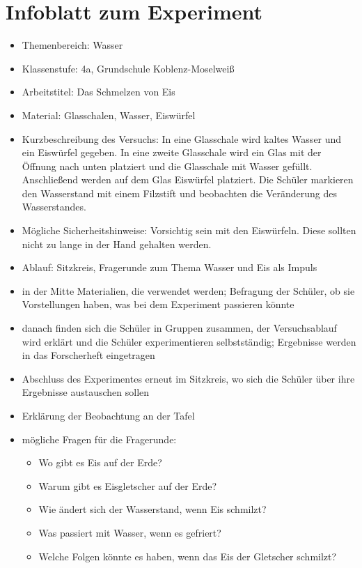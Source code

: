 \section{Infoblatt zum Experiment}

\begin{itemize}
	\item{Themenbereich: Wasser}
	\item{Klassenstufe: 4a, Grundschule Koblenz-Moselweiß}
	\item{Arbeitstitel: \glqq Das Schmelzen von Eis \grqq{}}
	\item{Material: Glasschalen, Wasser, Eiswürfel}
	\item{Kurzbeschreibung des Versuchs: In eine Glasschale wird kaltes Wasser und ein Eiswürfel gegeben. In eine zweite Glasschale wird ein Glas mit der Öffnung nach unten platziert und die Glasschale mit Wasser gefüllt. Anschließend werden auf dem Glas Eiswürfel platziert. Die Schüler markieren den Wasserstand mit einem Filzstift und beobachten die Veränderung des Wasserstandes.}
	\item{Mögliche Sicherheitshinweise: Vorsichtig sein mit den Eiswürfeln. Diese sollten nicht zu lange in der Hand gehalten werden.}
	\item{Ablauf: Sitzkreis, Fragerunde zum Thema Wasser und Eis als Impuls}
	\item{in der Mitte Materialien, die verwendet werden; Befragung der Schüler, ob sie Vorstellungen haben, was bei dem Experiment passieren könnte}
	\item{danach finden sich die Schüler in Gruppen zusammen, der Versuchsablauf wird erklärt und die Schüler experimentieren selbstständig; Ergebnisse werden in das Forscherheft eingetragen}
	\item{Abschluss des Experimentes erneut im Sitzkreis, wo sich die Schüler über ihre Ergebnisse austauschen sollen}
	\item{Erklärung der Beobachtung an der Tafel}
	\item{mögliche Fragen für die Fragerunde:
		\begin{itemize}
		\item{Wo gibt es Eis auf der Erde?}
		\item{Warum gibt es Eisgletscher auf der Erde?}
		\item{Wie ändert sich der Wasserstand, wenn Eis schmilzt?}
		\item{Was passiert mit Wasser, wenn es gefriert?}
		\item{Welche Folgen könnte es haben, wenn das Eis der Gletscher schmilzt?}
		
		\end{itemize}
		}
\end{itemize}
